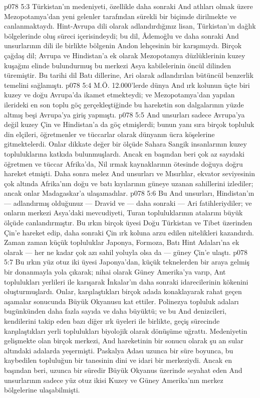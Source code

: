 \vs p078 5:3 Türkistan’ın medeniyeti, özellikle daha sonraki And atlıları olmak üzere Mezopotamya’dan yeni gelenler tarafından sürekli bir biçimde dirilmekte ve canlanmaktaydı. Hint\hyp{}Avrupa dili olarak adlandırdığınız lisan, Türkistan’ın dağlık bölgelerinde oluş süreci içerisindeydi; bu dil, Âdemoğlu ve daha sonraki And unsurlarının dili ile birlikte bölgenin Andon lehçesinin bir karışımıydı. Birçok çağdaş dil; Avrupa ve Hindistan’a ek olarak Mezopotamya düzlüklerinin kuzey kuşağını elinde bulundurmuş bu merkezi Asya kabilelerinin öncül dilinden türemiştir. Bu tarihi dil Batı dillerine, Ari olarak adlandırılan bütüncül benzerlik temelini sağlamıştı.
\vs p078 5:4 M.Ö. 12.000’lerde dünya And ırk kolunun üçte biri kuzey ve doğu Avrupa’da ikamet etmekteydi; ve Mezopotamya’dan yapılan ilerideki en son toplu göç gerçekleştiğinde bu hareketin son dalgalarının yüzde altmış beşi Avrupa’ya giriş yapmıştı.
\vs p078 5:5 And unsurları sadece Avrupa’ya değil kuzey Çin ve Hindistan’a da göç etmişlerdi; bunun yanı sıra birçok topluluk din elçileri, öğretmenler ve tüccarlar olarak dünyanın ücra köşelerine gitmektelerdi. Onlar dikkate değer bir ölçüde Sahara Sangik insanlarının kuzey topluluklarına katkıda bulunmuşlardı. Ancak en başından beri çok az sayıdaki öğretmen ve tüccar Afrika’da, Nil ırmak kaynaklarının ötesinde doğuya doğru hareket etmişti. Daha sonra melez And unsurları ve Mısırlılar, ekvator seviyesinin çok altında Afrika’nın doğu ve batı kıyılarının güneye uzanan sahillerini izlediler; ancak onlar Madagaskar’a ulaşamadılar.
\vs p078 5:6 Bu And unsurları, Hindistan’ın --- adlandırmış olduğunuz --- Dravid ve --- daha sonraki --- Ari fatihleriydiler; ve onların merkezi Asya’daki mevcudiyeti, Turan topluluklarının atalarını büyük ölçüde canlandırmıştır. Bu ırkın birçok üyesi Doğu Türkistan ve Tibet üzerinden Çin’e hareket edip, daha sonraki Çin ırk koluna arzu edilen nitelikleri kazandırdı. Zaman zaman küçük topluluklar Japonya, Formoza, Batı Hint Adaları’na ek olarak --- her ne kadar çok azı sahil yoluyla olsa da --- güney Çin’e ulaştı.
\vs p078 5:7 Bu ırkın yüz otuz iki üyesi Japonya’dan, küçük teknelerden bir araya gelmiş bir donanmayla yola çıkarak; nihai olarak Güney Amerika’ya varıp, Ant toplulukları yerlileri ile karışarak İnkalar’ın daha sonraki idarecilerinin kökenini oluşturmuşlardı. Onlar, karşılaştıkları birçok adada konaklayarak rahat geçen aşamalar sonucunda Büyük Okyanusu kat ettiler. Polinezya topluluk adaları bugünkünden daha fazla sayıda ve daha büyüktü; ve bu And denizcileri, kendilerini takip eden bazı diğer ırk üyeleri ile birlikte, geçiş sürecinde karşılaştıkları yerli toplulukları biyolojik olarak dönüşüme uğrattı. Medeniyetin gelişmekte olan birçok merkezi, And hareketinin bir sonucu olarak şu an sular altındaki adalarda yeşermişti. Paskalya Adası uzunca bir süre boyunca, bu kaybedilen topluluğun bir tanesinin dini ve idari bir merkeziydi. Ancak en başından beri, uzunca bir süredir Büyük Okyanus üzerinde seyahat eden And unsurlarının sadece yüz otuz ikisi Kuzey ve Güney Amerika’nın merkez bölgelerine ulaşabilmişti.
